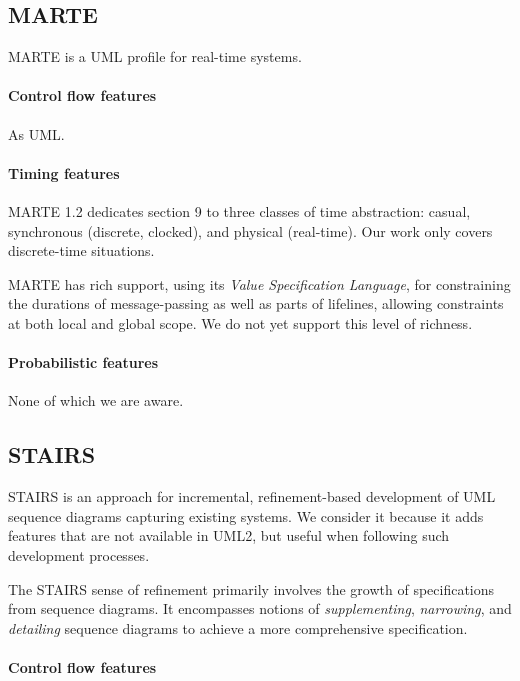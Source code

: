 \subsection{MARTE}

MARTE is a UML profile for real-time systems.

\paragraph{Control flow features}
As UML.

\paragraph{Timing features}
MARTE 1.2 dedicates section 9 to three classes of time abstraction:
casual, synchronous (discrete, clocked), and physical (real-time).  Our work
only covers discrete-time
situations.

MARTE has rich support, using its \emph{Value Specification Language}, for
constraining the durations of message-passing as well as parts of lifelines,
allowing constraints at both local
and global scope.  We do not yet support this level of richness.

\paragraph{Probabilistic features}
None of which we are aware.

\subsection{STAIRS}

STAIRS is an approach for incremental, refinement-based development of
UML sequence diagrams capturing existing systems.  We consider it
because it adds features that are not available in UML2, but useful when
following such development processes.

The STAIRS sense of refinement primarily involves the growth of
specifications from sequence diagrams.  It encompasses
notions of \emph{supplementing}, \emph{narrowing}, and
\emph{detailing} sequence diagrams to achieve a more
comprehensive specification.

\paragraph{Control flow features}

